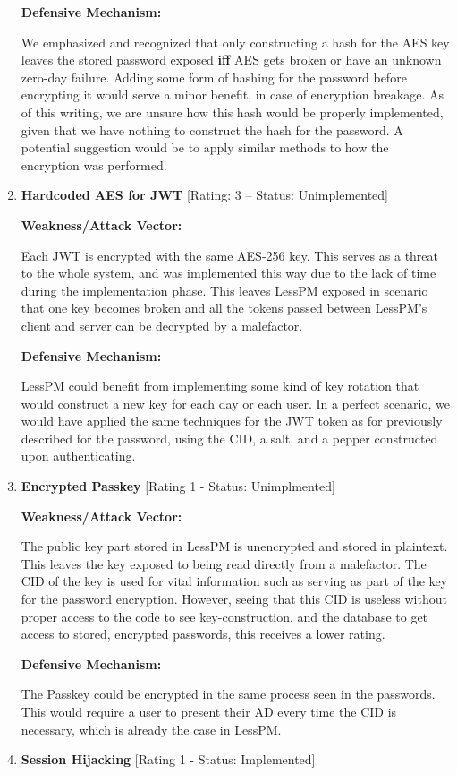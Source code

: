 \begin{enumerate}[label=$\blacktriangleright$]
  \textbf{Defensive Mechanism:}

  We emphasized and recognized that only constructing a hash
  for the AES key leaves the stored password exposed \textbf{iff} AES
  gets broken or have an unknown zero-day failure.
  Adding some form of hashing for the password before encrypting it would
  serve a minor benefit, in case of encryption breakage.
  As of this writing, we are unsure how this hash would be properly
  implemented, given that we have nothing to construct the hash for the
  password.
  A potential suggestion would be to apply similar methods to how the
  encryption was performed.

  \item \textbf{Hardcoded AES for JWT} [Rating: 3 -- Status: Unimplemented]

  \textbf{Weakness/Attack Vector:}

  Each JWT is encrypted with the same AES-256 key.
  This serves as a threat to the whole system, and was implemented this way
  due to the lack of time during the implementation phase.
  This leaves LessPM exposed in scenario that one key becomes broken and all
  the tokens passed between LessPM's client and server can be decrypted by a
  malefactor.

  \textbf{Defensive Mechanism:}

  LessPM could benefit from implementing some kind of key rotation that would
  construct a new key for each day or each user.
  In a perfect scenario, we would have applied the same techniques for the
  JWT token as for previously described for the password, using the CID, a
  salt, and a pepper constructed upon authenticating.

  \item \textbf{Encrypted Passkey} [Rating 1 - Status: Unimplmented]

  \textbf{Weakness/Attack Vector:}

  The public key part stored in LessPM is unencrypted and stored in plaintext.
  This leaves the key exposed to being read directly from a malefactor.
  The CID of the key is used for vital information such as serving as part of
  the key for the password encryption.
  However, seeing that this CID is useless without proper access to the code
  to see key-construction, and the database to get access to stored, encrypted
  passwords, this receives a lower rating.

  \textbf{Defensive Mechanism:}

  The Passkey could be encrypted in the same process seen in the passwords.
  This would require a user to present their AD every time the CID is
  necessary, which is already the case in LessPM\@.

  \item \textbf{Session Hijacking} [Rating 1 - Status: Implemented]

\end{enumerate}